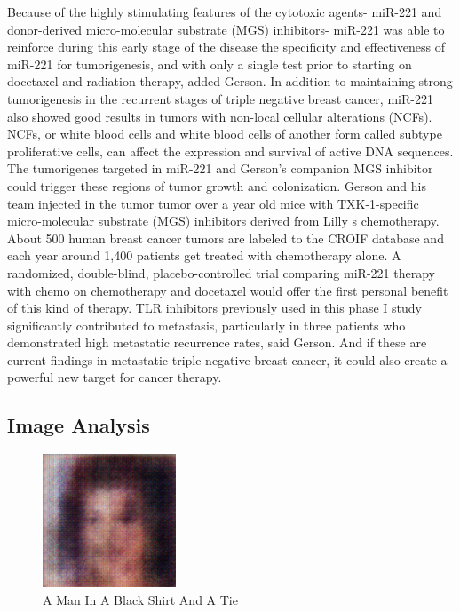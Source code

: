 \documentclass{article}%
\begin{document}
Because of the highly stimulating features of the cytotoxic agents{-} miR{-}221 and donor{-}derived micro{-}molecular substrate (MGS) inhibitors{-} miR{-}221 was able to reinforce during this early stage of the disease the specificity and effectiveness of miR{-}221 for tumorigenesis, and with only a single test prior to starting on docetaxel and radiation therapy, added Gerson.\newline%
In addition to maintaining strong tumorigenesis in the recurrent stages of triple negative breast cancer, miR{-}221 also showed good results in tumors with non{-}local cellular alterations (NCFs). NCFs, or white blood cells and white blood cells of another form called subtype proliferative cells, can affect the expression and survival of active DNA sequences. The tumorigenes targeted in miR{-}221 and Gerson's companion MGS inhibitor could trigger these regions of tumor growth and colonization.\newline%
Gerson and his team injected in the tumor tumor over a year old mice with TXK{-}1{-}specific micro{-}molecular substrate (MGS) inhibitors derived from Lilly s chemotherapy.\newline%
About 500 human breast cancer tumors are labeled to the CROIF database and each year around 1,400 patients get treated with chemotherapy alone. A randomized, double{-}blind, placebo{-}controlled trial comparing miR{-}221 therapy with chemo on chemotherapy and docetaxel would offer the first personal benefit of this kind of therapy.\newline%
TLR inhibitors previously used in this phase I study significantly contributed to metastasis, particularly in three patients who demonstrated high metastatic recurrence rates, said Gerson. And if these are current findings in metastatic triple negative breast cancer, it could also create a powerful new target for cancer therapy.

%
\subsection{Image Analysis}%
\label{subsec:ImageAnalysis}%


\begin{figure}[h!]%
\centering%
\includegraphics[width=150px]{500_fake_images/samples_5_100.png}%
\caption{A Man In A Black Shirt And A Tie}%
\end{figure}

%
\end{document}
